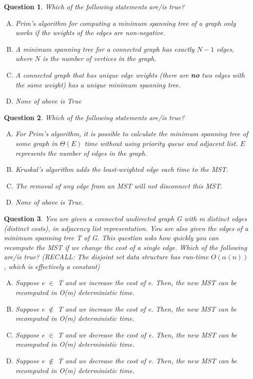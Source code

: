 \documentclass[10.5pt]{article}
\newtheorem{Q}{Question}
\begin{document}
\begin{Q}
	Which of the following statements are/is true?
	\begin{enumerate}[(A)]
		\item Prim's algorithm for computing a minimum spanning tree of a graph only works if the weights of the edges are non-negative.
		\item A minimum spanning tree for a connected graph has exactly $N-1$ edges, where $N$ is the number of vertices in the graph.
		\item A connected graph that has unique edge weights (there are \textbf{no} two edges with the same weight) has a unique minimum spanning tree.
		\item None of above is True
	\end{enumerate}
\end{Q}


\begin{Q}
	Which of the following statements are/is true?
	\begin{enumerate}[(A)]
		\item For Prim's algorithm, it is possible to calculate the minimum spanning tree of some graph in $\Theta(E)$ time without using priority queue and adjacent list. $E$ represents the number of edges in the graph.
		\item Kruskal's algorithm adds the least-weighted edge each time to the MST.
		\item The removal of any edge from an MST will not disconnect this MST.
		\item None of above is True.
	\end{enumerate}
\end{Q}


\begin{Q}
	You are given a connected undirected graph G with m distinct edges (distinct costs), in adjacency list representation. You are also given the edges of a minimum spanning tree T of G. This question asks how quickly you can recompute the MST if we change the cost of a single edge. Which of the following are/is true? (RECALL: The disjoint set data structure has run-time $O(\alpha (n))$, which is effectively a constant)
	\begin{enumerate}[(A)]
		\item Suppose e $\in$ T and we increase the cost of e. Then, the new MST can be recomputed in O(m) deterministic time.
		\item Suppose e $\notin$ T and we increase the cost of e. Then, the new MST can be recomputed in O(m) deterministic time.
		\item Suppose e $\in$ T and we decrease the cost of e. Then, the new MST can be recomputed in O(m) deterministic time.
		\item Suppose e $\notin$ T and we decrease the cost of e. Then, the new MST can be recomputed in O(m) deterministic time.
	\end{enumerate}
\end{Q}
\end{document}
